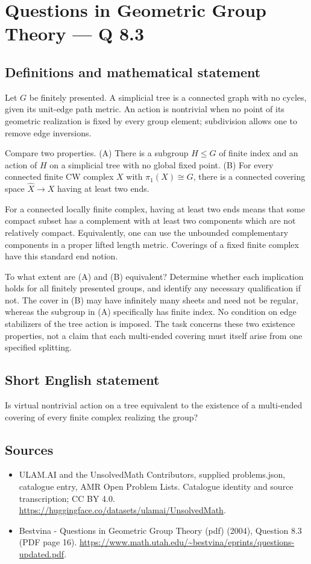 \documentclass[11pt,a4paper]{article}
\begin{document}
\section*{Questions in Geometric Group Theory — Q 8.3}\label{statement}

\subsection{Definitions and mathematical statement}
Let $G$ be finitely presented. A simplicial tree is a connected graph with no cycles, given its unit-edge path metric. An action is nontrivial when no point of its geometric realization is fixed by every group element; subdivision allows one to remove edge inversions.

Compare two properties. (A) There is a subgroup $H\leq G$ of finite index and an action of $H$ on a simplicial tree with no global fixed point. (B) For every connected finite CW complex $X$ with $\pi_1(X)\cong G$, there is a connected covering space $\widehat X\to X$ having at least two ends.

For a connected locally finite complex, having at least two ends means that some compact subset has a complement with at least two components which are not relatively compact. Equivalently, one can use the unbounded complementary components in a proper lifted length metric. Coverings of a fixed finite complex have this standard end notion.

To what extent are (A) and (B) equivalent? Determine whether each implication holds for all finitely presented groups, and identify any necessary qualification if not. The cover in (B) may have infinitely many sheets and need not be regular, whereas the subgroup in (A) specifically has finite index. No condition on edge stabilizers of the tree action is imposed. The task concerns these two existence properties, not a claim that each multi-ended covering must itself arise from one specified splitting.
\subsection{Short English statement}
Is virtual nontrivial action on a tree equivalent to the existence of a multi-ended covering of every finite complex realizing the group?
\subsection{Sources}
\begin{itemize}
\item[S1] ULAM.AI and the UnsolvedMath Contributors, supplied problems.json, catalogue entry, AMR Open Problem Lists. Catalogue identity and source transcription; CC BY 4.0.
\url{https://huggingface.co/datasets/ulamai/UnsolvedMath}.
\item[S2] Bestvina - Questions in Geometric Group Theory (pdf) (2004), Question 8.3 (PDF page 16). 
\url{https://www.math.utah.edu/~bestvina/eprints/questions-updated.pdf}.
\end{itemize}
\end{document}
